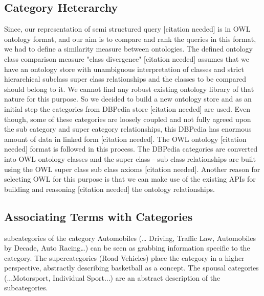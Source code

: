 \subsection{Category Heterarchy} 
Since, our representation of semi structured query [citation needed]
is in OWL ontology format, and our aim is to compare and rank the
queries in this format, we had to define a similarity measure between
ontologies. The defined ontology class comparison measure "class
divergence" [citation needed] assumes that we have an ontology store
with unambiguous interpretation of classes and strict hierarchical
subclass super class relationships and the classes to be compared
should belong to it. We cannot find any robust existing ontology
library of that nature for this purpose. So we decided to build a new
ontology store and as an initial step the categories from DBPedia
store [citation needed] are used. Even though, some of these
categories are loosely coupled and not fully agreed upon the sub
category and super category relationships, this DBPedia has enormous
amount of data in linked form [citation needed]. The OWL ontology
[citation needed] format is followed in this process. The DBPedia
categories are converted into OWL ontology classes and the super class
- sub class relationships are built using the OWL super class sub
class axioms [citation needed]. Another reason for selecting OWL for
this purpose is that we can make use of the existing APIs for building
and reasoning [citation needed] the ontology relationships.





\subsection{Associating Terms with Categories} %
subcategories of the category Automobiles (… Driving, Traffic Law,
Automobiles by Decade, Auto Racing…) can be seen as grabbing
information specific to the category. The supercategories (Road
Vehicles) place the category in a higher perspective, abstractly
describing basketball as a concept. The spousal categories
(...Motorsport, Individual Sport...) are an abstract description of
the subcategories.


